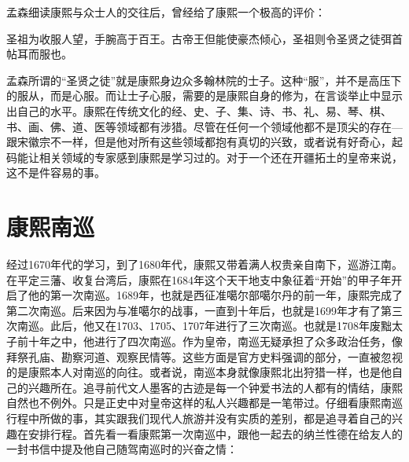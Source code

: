 
孟森细读康熙与众士人的交往后，曾经给了康熙一个极高的评价：



\begin{bookquote}圣祖为收服人望，手腕高于百王。古帝王但能使豪杰倾心，圣祖则令圣贤之徒弭首帖耳而服也。\end{bookquote}


孟森所谓的“圣贤之徒”就是康熙身边众多翰林院的士子。这种“服”，并不是高压下的服从，而是心服。而让士子心服，需要的是康熙自身的修为，在言谈举止中显示出自己的水平。康熙在传统文化的经、史、子、集、诗、书、礼、易、琴、棋、书、画、佛、道、医等领域都有涉猎。尽管在任何一个领域他都不是顶尖的存在—跟宋徽宗不一样，但是他对所有这些领域都抱有真切的兴致，或者说有好奇心，起码能让相关领域的专家感到康熙是学习过的。对于一个还在开疆拓土的皇帝来说，这不是件容易的事。


\begin{sectionnotes}








\end{sectionnotes}
\section{康熙南巡}


经过1670年代的学习，到了1680年代，康熙又带着满人权贵亲自南下，巡游江南。在平定三藩、收复台湾后，康熙在1684年这个天干地支中象征着“开始”的甲子年开启了他的第一次南巡。1689年，也就是西征准噶尔部噶尔丹的前一年，康熙完成了第二次南巡。后来因为与准噶尔的战事，一直到十年后，也就是1699年才有了第三次南巡。此后，他又在1703、1705、1707年进行了三次南巡。也就是1708年废黜太子前十年之中，他进行了四次南巡。作为皇帝，南巡无疑承担了众多政治任务，像拜祭孔庙、勘察河道、观察民情等。这些方面是官方史料强调的部分，一直被忽视的是康熙本人对南巡的向往。或者说，南巡本身就像康熙北出狩猎一样，也是他自己的兴趣所在。追寻前代文人墨客的古迹是每一个钟爱书法的人都有的情结，康熙自然也不例外。只是正史中对皇帝这样的私人兴趣都是一笔带过。仔细看康熙南巡行程中所做的事，其实跟我们现代人旅游并没有实质的差别，都是追寻着自己的兴趣在安排行程。首先看一看康熙第一次南巡中，跟他一起去的纳兰性德在给友人的一封书信中提及他自己随驾南巡时的兴奋之情：


